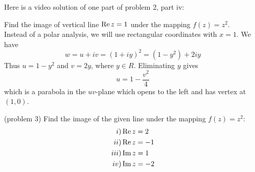 \documentclass[handout]{ximera}
\begin{document}
Here is a video solution of one part of problem 2, part iv:\\
\begin{foldable}
\end{foldable}

\begin{example}[example 3]
Find the image of vertical line $\operatorname{Re} z = 1$ under the mapping $f(z) = z^2$.\\
Instead of a polar analysis, we will use rectangular coordinates with $x = 1$. We have
\[
w = u+iv = (1+iy)^2 = (1-y^2) + 2iy
\]
Thus $u = 1-y^2$ and $v = 2y$, where $y \in R$. Eliminating $y$ gives
\[
u= 1-\frac{v^2}{4}
\]
which is a parabola in the $uv$-plane which opens to the left and has vertex at $(1,0)$.


\begin{image}
\end{image}

\end{example}


\begin{problem}(problem 3)
Find the image of the given line under the mapping $f(z) = z^2$:
\begin{align*}
i) & \operatorname{Re} z = 2 \\
ii) & \operatorname{Re} z = -1\\
iii) & \operatorname{Im} z = 1\\
iv) & \operatorname{Im} z = -2
\end{align*}
\end{problem}
\end{document}
